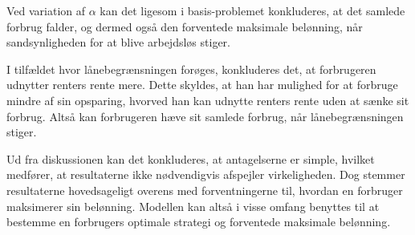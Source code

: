 Ved variation af $\alpha$ kan det ligesom i basis-problemet konkluderes, at det samlede forbrug falder, og dermed også den forventede maksimale belønning, når sandsynligheden for at blive arbejdsløs stiger. 

I tilfældet hvor lånebegrænsningen forøges, konkluderes det, at forbrugeren udnytter renters rente mere. Dette skyldes, at han har mulighed for at forbruge mindre af sin opsparing, hvorved han kan udnytte renters rente uden at sænke sit forbrug. Altså kan forbrugeren hæve sit samlede forbrug, når lånebegrænsningen stiger. 

Ud fra diskussionen kan det konkluderes, at antagelserne er simple, hvilket medfører, at resultaterne ikke nødvendigvis afspejler virkeligheden. Dog stemmer resultaterne hovedsageligt overens med forventningerne til, hvordan en forbruger maksimerer sin belønning. Modellen kan altså i visse omfang benyttes til at bestemme en forbrugers optimale strategi og forventede maksimale belønning.















